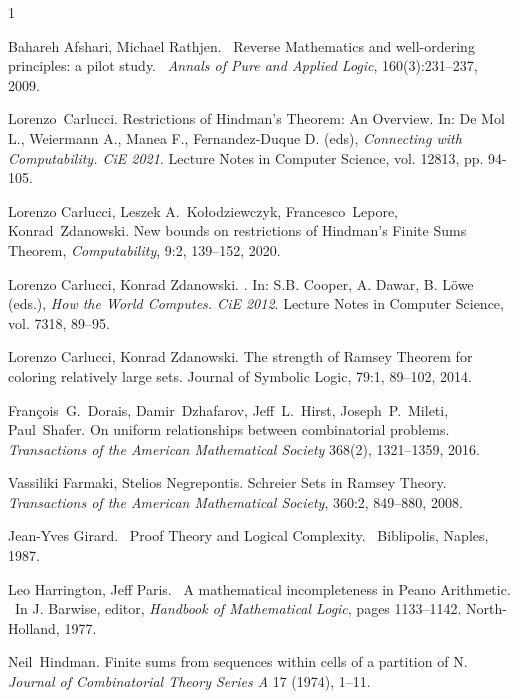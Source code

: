 \documentclass{amsart}
\begin{document}
\begin{thebibliography}{1}

 Bahareh Afshari, Michael Rathjen.
 \newblock\ Reverse Mathematics and well-ordering principles: a pilot study.
 \newblock\ {\em Annals of Pure and Applied Logic}, 160(3):231--237, 2009.


Lorenzo~Carlucci.
Restrictions of Hindman's Theorem: An Overview. 
In: De Mol L., Weiermann A., Manea F., Fernandez-Duque D. (eds), 
{\em Connecting with Computability. CiE 2021}. Lecture Notes in Computer Science, vol. 12813, pp. 94-105.

Lorenzo Carlucci, Leszek A.~Ko{\l}odziewczyk, Francesco~Lepore, Konrad~Zdanowski. 
New bounds on restrictions of Hindman's Finite Sums Theorem,
{\em Computability}, 9:2, 139--152, 2020.


\newblock Lorenzo Carlucci, Konrad Zdanowski.
.
\newblock In: S.B. Cooper, A. Dawar, B. Löwe (eds.), {\em How the World Computes. CiE 2012}. 
Lecture Notes in Computer Science, vol. 7318, 89--95.

\newblock Lorenzo Carlucci, Konrad Zdanowski.
\newblock The strength of Ramsey Theorem for coloring relatively large sets. 
\newblock Journal of Symbolic Logic, 79:1, 89--102, 2014.

Fran\c{c}ois~G.~Dorais, Damir~Dzhafarov, Jeff~L.~Hirst, Joseph~P.~Mileti, Paul~Shafer. 
On uniform relationships between combinatorial problems. 
{\em Transactions of the American Mathematical Society} 368(2), 1321--1359, 2016.


Vassiliki Farmaki, Stelios Negrepontis.
Schreier Sets in Ramsey Theory. 
\textit{Transactions of the American Mathematical Society}, 360:2, 849--880, 2008.

 Jean-Yves Girard.
 \newblock\ Proof Theory and Logical Complexity.
 \newblock\ Biblipolis, Naples, 1987.

 Leo Harrington, Jeff Paris.
 \newblock\ A mathematical incompleteness in Peano Arithmetic.
 \newblock\ In J. Barwise, editor, {\em Handbook of Mathematical Logic}, pages
   1133--1142. North-Holland, 1977.

Neil~Hindman. 
Finite sums from sequences within cells of a partition of N.
{\em Journal of Combinatorial Theory Series A} 17 (1974), 1--11.



\end{thebibliography}
\end{document}
